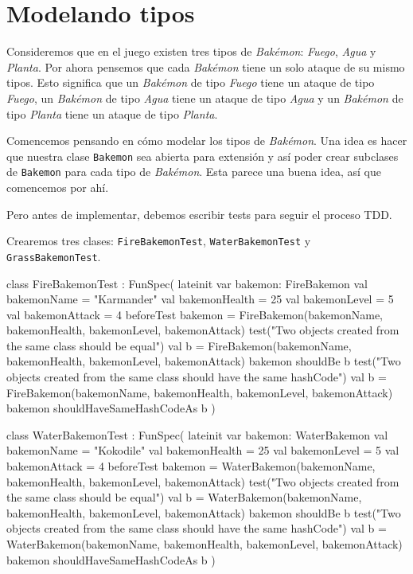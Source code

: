 \section{Modelando tipos}
  Consideremos que en el juego existen tres tipos de \textit{Bakémon}: \textit{Fuego},
  \textit{Agua} y \textit{Planta}.
  Por ahora pensemos que cada \textit{Bakémon} tiene un solo ataque de su mismo tipos.
  Esto significa que un \textit{Bakémon} de tipo \textit{Fuego} tiene un ataque de tipo
  \textit{Fuego}, un \textit{Bakémon} de tipo \textit{Agua} tiene un ataque de tipo
  \textit{Agua} y un \textit{Bakémon} de tipo \textit{Planta} tiene un ataque de tipo
  \textit{Planta}.

  Comencemos pensando en cómo modelar los tipos de \textit{Bakémon}.
  Una idea es hacer que nuestra clase \texttt{Bakemon} sea abierta para extensión y así poder
  crear subclases de \texttt{Bakemon} para cada tipo de \textit{Bakémon}.
  Esta parece una buena idea, así que comencemos por ahí.

  Pero antes de implementar, debemos escribir tests para seguir el proceso TDD.

  Crearemos tres clases: \texttt{FireBakemonTest}, \texttt{WaterBakemonTest} y
  \texttt{GrassBakemonTest}.

  \begin{kotlin}
    class FireBakemonTest : FunSpec({
      lateinit var bakemon: FireBakemon
      val bakemonName = "Karmander"
      val bakemonHealth = 25
      val bakemonLevel = 5
      val bakemonAttack = 4
      beforeTest {
        bakemon = FireBakemon(bakemonName, bakemonHealth, bakemonLevel, bakemonAttack)
      }
      test("Two objects created from the same class should be equal") {
        val b = FireBakemon(bakemonName, bakemonHealth, bakemonLevel, bakemonAttack)
        bakemon shouldBe b
      }
      test("Two objects created from the same class should have the same hashCode") {
        val b = FireBakemon(bakemonName, bakemonHealth, bakemonLevel, bakemonAttack)
        bakemon shouldHaveSameHashCodeAs b
      }
    })
  \end{kotlin}

  \begin{kotlin}
    class WaterBakemonTest : FunSpec({
      lateinit var bakemon: WaterBakemon
      val bakemonName = "Kokodile"
      val bakemonHealth = 25
      val bakemonLevel = 5
      val bakemonAttack = 4
      beforeTest {
        bakemon = WaterBakemon(bakemonName, bakemonHealth, bakemonLevel, bakemonAttack)
      }
      test("Two objects created from the same class should be equal") {
        val b = WaterBakemon(bakemonName, bakemonHealth, bakemonLevel, bakemonAttack)
        bakemon shouldBe b
      }
      test("Two objects created from the same class should have the same hashCode") {
        val b = WaterBakemon(bakemonName, bakemonHealth, bakemonLevel, bakemonAttack)
        bakemon shouldHaveSameHashCodeAs b
      }
  })
  \end{kotlin}

